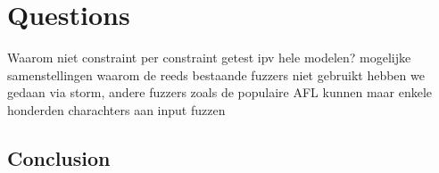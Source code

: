 \chapter{Questions}
Waarom niet constraint per constraint getest ipv hele modelen?
	mogelijke samenstellingen 
waarom de reeds bestaande fuzzers niet gebruikt
	hebben we gedaan via storm, andere fuzzers zoals de populaire AFL kunnen maar enkele honderden  charachters aan input fuzzen

%
%
%


\section{Conclusion}

